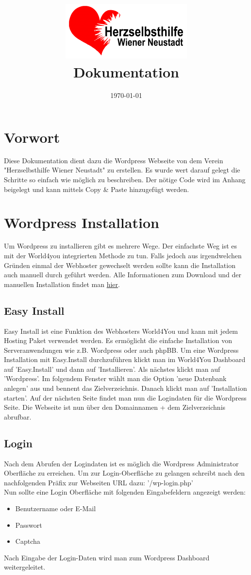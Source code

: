 \documentclass[a4paper]{article}
\title{\includegraphics[scale=1]{img/logo}\\ Dokumentation}
\date{\normalsize \today}
\begin{document}
\maketitle
\newpage
\section*{Vorwort}

Diese Dokumentation dient dazu die Wordpress Webseite von dem Verein "Herzselbsthilfe Wiener Neustadt" zu erstellen. Es wurde wert darauf gelegt die Schritte so einfach wie möglich zu beschreiben. Der nötige Code wird im Anhang beigelegt und kann mittels Copy \& Paste hinzugefügt werden.

\newpage
\tableofcontents
\newpage
\section{Wordpress Installation}
Um Wordpress zu installieren gibt es mehrere Wege. Der einfachste Weg ist es mit der World4you integrierten Methode zu tun. Falls jedoch aus irgendwelchen Gründen einmal der Webhoster gewechselt werden sollte kann die Installation auch manuell durch geführt werden. Alle Informationen zum Download und der manuellen Installation findet man \href{https://de.wordpress.org/download/}{hier}.
\subsection{Easy Install}

Easy Install ist eine Funktion des Webhosters World4You und kann mit jedem Hosting Paket verwendet werden. Es ermöglicht die einfache Installation von Serveranwendungen wie z.B. Wordpress oder auch phpBB. Um eine Wordpress Installation mit Easy.Install durchzuführen klickt man im World4You Dashboard auf 'Easy.Install' und dann auf 'Installieren'. Als nächstes klickt man auf 'Wordpress'. Im folgendem Fenster wählt man die Option 'neue Datenbank anlegen' aus und bennent das Zielverzeichnis. Danach klickt man auf 'Installation starten'. Auf der nächsten Seite findet man nun die Logindaten für die Wordpress Seite. Die Webseite ist nun über den Domainnamen + dem Zielverzeichnis abrufbar. 

\subsection{Login}

Nach dem Abrufen der Logindaten ist es möglich die Wordpress Administrator Oberfläche zu erreichen. Um zur Login-Oberfläche zu gelangen schreibt nach den nachfolgenden Präfix zur Webseiten URL dazu: '/wp-login.php'
\\
Nun sollte eine Login Oberfläche mit folgenden Eingabefeldern angezeigt werden: 
\begin{itemize}
	\item Benutzername oder E-Mail
	\item Passwort
	\item Captcha
\end{itemize}
Nach Eingabe der Login-Daten wird man zum Wordpress Dashboard weitergeleitet.
\end{document}
